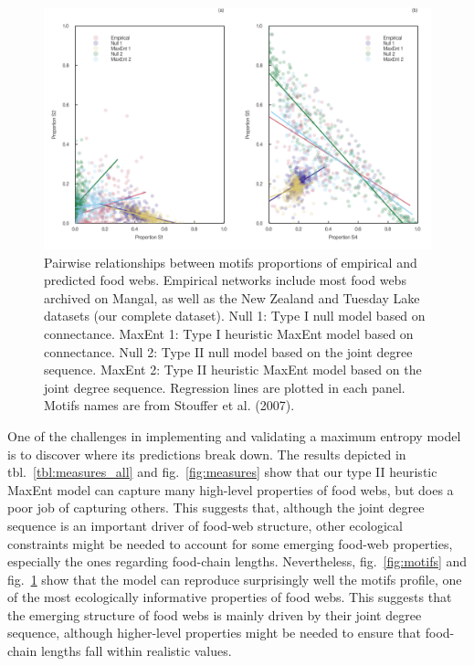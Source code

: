 \documentclass[11pt]{article}
\makeatletter
\def\maxwidth{\ifdim\Gin@nat@width>\linewidth\linewidth
\else\Gin@nat@width\fi}
\let\Oldincludegraphics\includegraphics
\renewcommand{\includegraphics}[1]{\Oldincludegraphics[width=\maxwidth]{#1}}
\makeatother
\begin{document}
\begin{figure}
\hypertarget{fig:motifs_rel}{%
\centering
\includegraphics{figures/motifs_relations.png}
\caption{Pairwise relationships between motifs proportions of empirical
and predicted food webs. Empirical networks include most food webs
archived on Mangal, as well as the New Zealand and Tuesday Lake datasets
(our complete dataset). Null 1: Type I null model based on connectance.
MaxEnt 1: Type I heuristic MaxEnt model based on connectance. Null 2:
Type II null model based on the joint degree sequence. MaxEnt 2: Type II
heuristic MaxEnt model based on the joint degree sequence. Regression
lines are plotted in each panel. Motifs names are from Stouffer et al.
(2007).}\label{fig:motifs_rel}
}
\end{figure}

One of the challenges in implementing and validating a maximum entropy
model is to discover where its predictions break down. The results
depicted in tbl.~\ref{tbl:measures_all} and fig.~\ref{fig:measures} show
that our type II heuristic MaxEnt model can capture many high-level
properties of food webs, but does a poor job of capturing others. This
suggests that, although the joint degree sequence is an important driver
of food-web structure, other ecological constraints might be needed to
account for some emerging food-web properties, especially the ones
regarding food-chain lengths. Nevertheless, fig.~\ref{fig:motifs} and
fig.~\ref{fig:motifs_rel} show that the model can reproduce surprisingly
well the motifs profile, one of the most ecologically informative
properties of food webs. This suggests that the emerging structure of
food webs is mainly driven by their joint degree sequence, although
higher-level properties might be needed to ensure that food-chain
lengths fall within realistic values.
\end{document}
